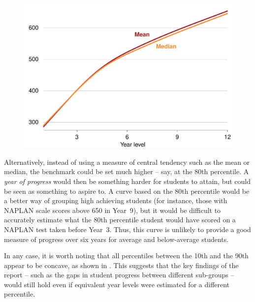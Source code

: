 \begin{figure}[t]
 \includegraphics[width=\columnwidth]{atlas/mean_cyl.pdf}\label{fig:mean_cyl}

\end{figure}

Alternatively, instead of using a measure of central tendency such as the mean or median, the benchmark could be set much higher -- say, at the 80th percentile. A \textit{year of progress} would then be something harder for students to attain, but could be seen as something to aspire to. A curve based on the 80th percentile would be a better way of grouping high achieving students (for instance, those with NAPLAN scale scores above 650 in \mbox{Year 9}), but it would be difficult to accurately estimate what the 80th percentile student would have scored on a NAPLAN test taken before \mbox{Year 3}. Thus, this curve is unlikely to provide a good measure of progress over six years for average and below-average students.

In any case, it is worth noting that all percentiles between the 10th and the 90th appear to be concave, as shown in . This suggests that the key findings of the report -- such as the gaps in student progress between different sub-groups -- would still hold even if equivalent year levels were estimated for a different percentile.

